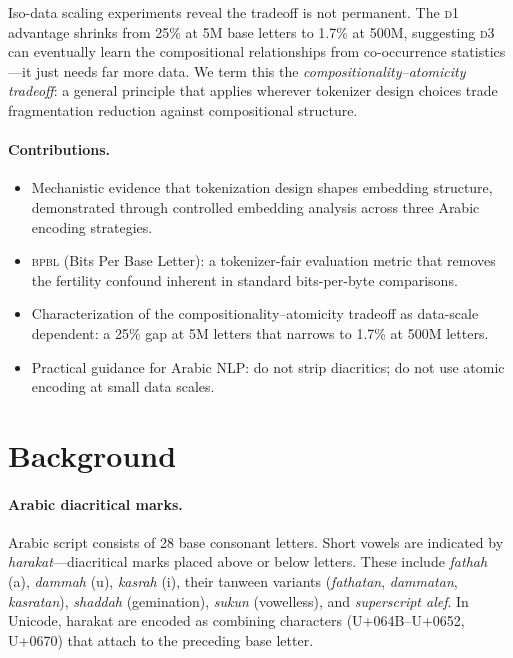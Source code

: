 \documentclass[11pt]{article}
\newcommand{\dOne}{\textsc{d1}}
\newcommand{\dThree}{\textsc{d3}}
\newcommand{\bpbl}{\textsc{bpbl}}
\begin{document}
Iso-data scaling experiments reveal the tradeoff is not permanent.
The \dOne{} advantage shrinks from 25\% at 5M base letters to 1.7\% at 500M, suggesting \dThree{} can eventually learn the compositional relationships from co-occurrence statistics---it just needs far more data.
We term this the \emph{compositionality--atomicity tradeoff}: a general principle that applies wherever tokenizer design choices trade fragmentation reduction against compositional structure.

\paragraph{Contributions.}
\begin{itemize}
\item Mechanistic evidence that tokenization design shapes embedding structure, demonstrated through controlled embedding analysis across three Arabic encoding strategies.
\item \bpbl{} (Bits Per Base Letter): a tokenizer-fair evaluation metric that removes the fertility confound inherent in standard bits-per-byte comparisons.
\item Characterization of the compositionality--atomicity tradeoff as data-scale dependent: a 25\% gap at 5M letters that narrows to 1.7\% at 500M letters.
\item Practical guidance for Arabic NLP: do not strip diacritics; do not use atomic encoding at small data scales.
\end{itemize}

\section{Background}
\label{sec:background}

\paragraph{Arabic diacritical marks.}
Arabic script consists of 28 base consonant letters.
Short vowels are indicated by \emph{harakat}---diacritical marks placed above or below letters.
These include \emph{fathah} (a), \emph{dammah} (u), \emph{kasrah} (i), their tanween variants (\emph{fathatan}, \emph{dammatan}, \emph{kasratan}), \emph{shaddah} (gemination), \emph{sukun} (vowelless), and \emph{superscript alef}.
In Unicode, harakat are encoded as combining characters (U+064B--U+0652, U+0670) that attach to the preceding base letter.
\end{document}
